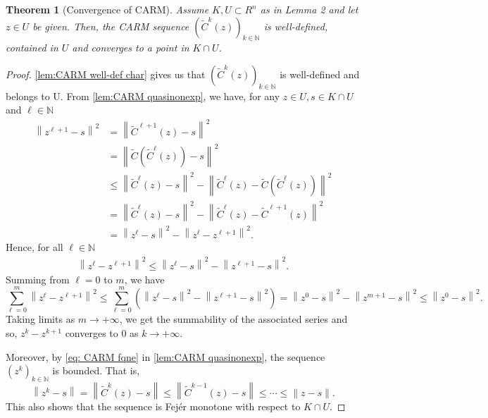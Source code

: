 \documentclass[smallextended,numbook,nospthms]{svjour3}
\theoremstyle{plain}
\newtheorem{theorem}{Theorem}[subsection]
\theoremstyle{definition}
\def\NN{\mathds N}
\begin{document}
\begin{theorem}[Convergence of CARM]\label{thm:CARM conv}
	Assume $K, U \subset R^{n}$ as in Lemma 2 and let $z \in U$ be given. Then, the CARM sequence $\left(\tilde{C}^{k}(z)\right)_{k \in \NN}$ is well-defined, contained in $U$ and converges to a point in $K \cap U$.
\end{theorem}
\begin{proof}
	 \cref{lem:CARM well-def char} gives us that $\left(\tilde{C}^{k}(z)\right)_{k \in \NN}$ is well-defined and belongs to U.
	From  \cref{lem:CARM quasinonexp}, we have, for any $z \in U, s \in K \cap U$ and $\ell \in \NN$
	\begin{align}
		\left\|z^{\ell+1}-s\right\|^{2} &=\left\|\tilde{C}^{\ell+1}(z)-s\right\|^{2} \\
		&=\left\|\tilde{C}\left(\tilde{C}^{\ell}(z)\right)-s\right\|^{2} \\
		& \leq\left\|\tilde{C}^{\ell}(z)-s\right\|^{2}-\left\|\tilde{C}^{\ell}(z)-\tilde{C}\left(\tilde{C}^{\ell}(z)\right)\right\|^{2} \\
		&=\left\|\tilde{C}^{\ell}(z)-s\right\|^{2}-\left\|\tilde{C}^{\ell}(z)-\tilde{C}^{\ell+1}(z)\right\|^{2} \\
		&=\left\|z^{\ell}-s\right\|^{2}-\left\|z^{\ell}-z^{\ell+1}\right\|^{2}.
	\end{align}
	Hence, for all $\ell \in \NN$
	\begin{align}
		\left\|z^{\ell}-z^{\ell+1}\right\|^{2} \leq\left\|z^{\ell}-s\right\|^{2}-\left\|z^{\ell+1}-s\right\|^{2}.
	\end{align} 
	Summing from $\ell=0$ to $m$, we have
	\begin{equation}
		\sum_{\ell=0}^{m}\left\|z^{\ell}-z^{\ell+1}\right\|^{2} \leq \sum_{\ell=0}^{m}\left(\left\|z^{\ell}-s\right\|^{2}-\left\|z^{\ell+1}-s\right\|^{2}\right)=\left\|z^{0}-s\right\|^{2}-\left\|z^{m+1}-s\right\|^{2} \leq\left\|z^{0}-s\right\|^{2}.
	\end{equation}
	Taking limits as $m \rightarrow+\infty$, we get the summability of the associated series and so, $z^{k}-z^{k+1}$ converges to 0 as $k \rightarrow+\infty$.
	
	Moreover, by \cref{eq: CARM fqne} in  \cref{lem:CARM quasinonexp}, the sequence $\left(z^{k}\right)_{k \in \NN}$ is bounded. That is,
	\begin{equation}
		\left\|z^{k}-s\right\| = \left\|\tilde{C}^{k}(z)-s\right\| \leq\left\|\tilde{C}^{k-1}(z)-s\right\| \leq \cdots \leq\|z-s\|.
	\end{equation}
	This also shows that the sequence is Fejér monotone with respect to $K \cap U$.
	

\end{proof}
\end{document}
